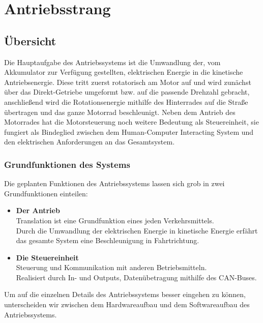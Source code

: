 \chapter{Antriebsstrang}


\section{Übersicht}
Die Hauptaufgabe des Antriebssystems ist die Umwandlung der, vom Akkumulator zur Verfügung gestellten, elektrischen Energie in die kinetische Antriebsenergie. Diese tritt zuerst rotatorisch am Motor auf und wird zunächst über das Direkt-Getriebe umgeformt bzw. auf die passende Drehzahl gebracht, anschließend wird die Rotationsenergie mithilfe des Hinterrades auf die Straße übertragen und das ganze Motorrad beschleunigt. Neben dem Antrieb des Motorrades hat die Motorsteuerung noch weitere Bedeutung als Steuereinheit, sie fungiert als Bindeglied zwischen dem Human-Computer Interacting System und den elektrischen Anforderungen an das Gesamtsystem.


\subsection{Grundfunktionen des Systems}
Die geplanten Funktionen des Antriebssystems lassen sich grob in zwei Grundfunktionen einteilen:

\begin{itemize}
	\item \textbf{Der Antrieb} 
	\\ \medskip Translation ist eine Grundfunktion eines jeden Verkehrsmittels.
	\\ Durch die Umwandlung der elektrischen Energie in kinetische Energie erfährt 
	\\ das gesamte System eine Beschleunigung in Fahrtrichtung.
	\medskip
	\item \textbf{Die Steuereinheit}
	\\ \medskip Steuerung und Kommunikation mit anderen Betriebsmitteln.
	\\ Realisiert durch In- und Outputs, Datenübetragung mithilfe des CAN-Buses. 
\end{itemize}

\vspace{5mm}

Um auf die einzelnen Details des Antriebssystems besser eingehen zu können, unterscheiden wir zwischen dem Hardwareaufbau und dem Softwareaufbau des Antriebssystems.


